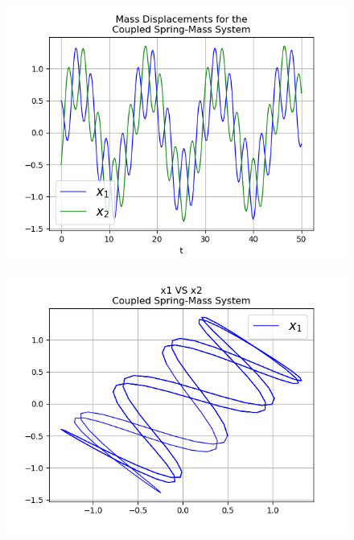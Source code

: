 \documentclass{article}
\begin{document}
\begin{figure}[h]
\centering
\includegraphics[scale=0.5]{r8.png}
\label{figure: Resortes acoplados }
\end{figure}

\begin{figure}[h]
\centering
\includegraphics[scale=0.5]{r9.png}
\label{figure: Resortes acoplados }
\end{figure}
\end{document}
